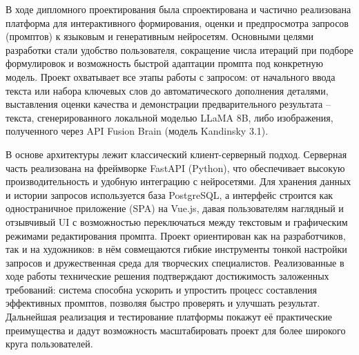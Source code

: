 \label{sec:practice:conclusion}
В ходе дипломного проектирования была спроектирована и частично реализована платформа для интерактивного формирования, оценки и предпросмотра запросов (промптов) к языковым и генеративным нейросетям. Основными целями разработки стали удобство пользователя, сокращение числа итераций при подборе формулировок и возможность быстрой адаптации промпта под конкретную модель. Проект охватывает все этапы работы с запросом: от начального ввода текста или набора ключевых слов до автоматического дополнения деталями, выставления оценки качества и демонстрации предварительного результата – текста, сгенерированного локальной моделью LLaMA 8B, либо изображения, полученного через API Fusion Brain (модель Kandinsky 3.1).

В основе архитектуры лежит классический клиент-серверный подход. Серверная часть реализована на фреймворке FastAPI (Python), что обеспечивает высокую производительность и удобную интеграцию с нейросетями. Для хранения данных и истории запросов используется база PostgreSQL, а интерфейс строится как одностраничное приложение (SPA) на Vue.js, давая пользователям наглядный и отзывчивый UI с возможностью переключаться между текстовым и графическим режимами редактирования промпта. Проект ориентирован как на разработчиков, так и на художников: в нём совмещаются гибкие инструменты тонкой настройки запросов и дружественная среда для творческих специалистов. Реализованные в ходе работы технические решения подтверждают достижимость заложенных требований: система способна ускорить и упростить процесс составления эффективных промптов, позволяя быстро проверять и улучшать результат. Дальнейшая реализация и тестирование платформы покажут её практические преимущества и дадут возможность масштабировать проект для более широкого круга пользователей.